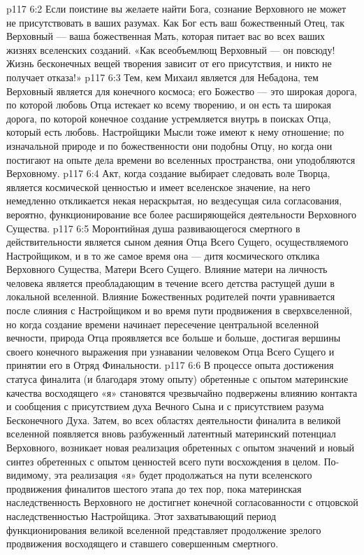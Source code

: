 \vs p117 6:2 Если поистине вы желаете найти Бога, сознание Верховного не может не присутствовать в ваших разумах. Как Бог есть ваш божественный Отец, так Верховный --- ваша божественная Мать, которая питает вас во всех ваших жизнях вселенских созданий. «Как всеобъемлющ Верховный --- он повсюду! Жизнь бесконечных вещей творения зависит от его присутствия, и никто не получает отказа!»
\vs p117 6:3 Тем, кем Михаил является для Небадона, тем Верховный является для конечного космоса; его Божество --- это широкая дорога, по которой любовь Отца истекает ко всему творению, и он есть та широкая дорога, по которой конечное создание устремляется внутрь в поисках Отца, который есть любовь. Настройщики Мысли тоже имеют к нему отношение; по изначальной природе и по божественности они подобны Отцу, но когда они постигают на опыте дела времени во вселенных пространства, они уподобляются Верховному.
\vs p117 6:4 \pc Акт, когда создание выбирает следовать воле Творца, является космической ценностью и имеет вселенское значение, на него немедленно откликается некая нераскрытая, но вездесущая сила согласования, вероятно, функционирование все более расширяющейся деятельности Верховного Существа.
\vs p117 6:5 Моронтийная душа развивающегося смертного в действительности является сыном деяния Отца Всего Сущего, осуществляемого Настройщиком, и в то же самое время она --- дитя космического отклика Верховного Существа, Матери Всего Сущего. Влияние матери на личность человека является преобладающим в течение всего детства растущей души в локальной вселенной. Влияние Божественных родителей почти уравнивается после слияния с Настройщиком и во время пути продвижения в сверхвселенной, но когда создание времени начинает пересечение центральной вселенной вечности, природа Отца проявляется все больше и больше, достигая вершины своего конечного выражения при узнавании человеком Отца Всего Сущего и принятии его в Отряд Финальности.
\vs p117 6:6 В процессе опыта достижения статуса финалита (и благодаря этому опыту) обретенные с опытом материнские качества восходящего «я» становятся чрезвычайно подвержены влиянию контакта и сообщения с присутствием духа Вечного Сына и с присутствием разума Бесконечного Духа. Затем, во всех областях деятельности финалита в великой вселенной появляется вновь разбуженный латентный материнский потенциал Верховного, возникает новая реализация обретенных с опытом значений и новый синтез обретенных с опытом ценностей всего пути восхождения в целом. По\hyp{}видимому, эта реализация «я» будет продолжаться на пути вселенского продвижения финалитов шестого этапа до тех пор, пока материнская наследственность Верховного не достигнет конечной согласованности с отцовской наследственностью Настройщика. Этот захватывающий период функционирования великой вселенной представляет продолжение зрелого продвижения восходящего и ставшего совершенным смертного.
